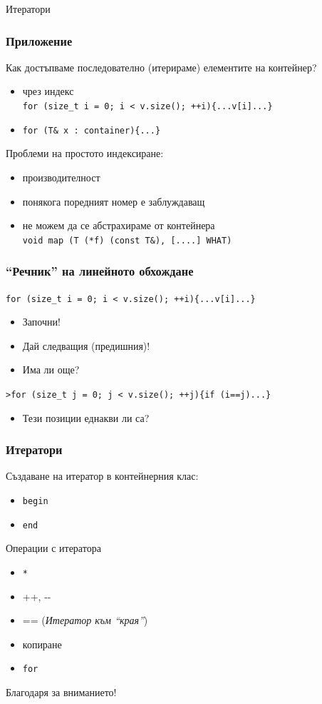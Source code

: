 \documentclass{beamer}
\begin{document}
\begin{frame}
\centerline{Итератори}
\end{frame}

\begin{frame}[fragile]
  \frametitle{Приложение}

  Как достъпваме последователно (итерираме) елементите на контейнер?
  \begin{itemize}
    \item чрез индекс \\
          \verb#for (size_t i = 0; i < v.size(); ++i){...v[i]...}#
    \item \verb#for (T& x : container){...}#
  \end{itemize}
  Проблеми на простото индексиране:
  \begin{itemize}
    \item производителност
    \item понякога поредният номер е заблуждаващ
    \item не можем да се абстрахираме от контейнера\\
    \verb#void map (T (*f) (const T&), [....] WHAT)#
  \end{itemize}
  
  
  \end{frame}

  
  \begin{frame}[fragile]
    \frametitle{``Речник'' на линейното обхождане}
  
    \verb#for (size_t i = 0; i < v.size(); ++i){...v[i]...}#

    \begin{itemize}
      \item Започни!
      \item Дай следващия (предишния)!
      \item Има ли още?
    \end{itemize}
    \verb#>for (size_t j = 0; j < v.size(); ++j){if (i==j)...}#   
    \begin{itemize}
      \item Тези позиции еднакви ли са?
    \end{itemize}
  \end{frame}
  


\begin{frame}[fragile]
\frametitle{Итератори}

Създаване на итератор в контейнерния клас:
\begin{itemize}
  \item \texttt{begin}
  \item \texttt{end}
\end{itemize}
Операции с итератора
\begin{itemize}
  \item \texttt{*}
  \item ++, -{}-
  \item == (\emph{Итератор към ``края''})
  \item копиране
  \item \texttt{for}
\end{itemize}


\end{frame}


\begin{frame}
\centerline{Благодаря за вниманието!}
\end{frame}
\end{document}
